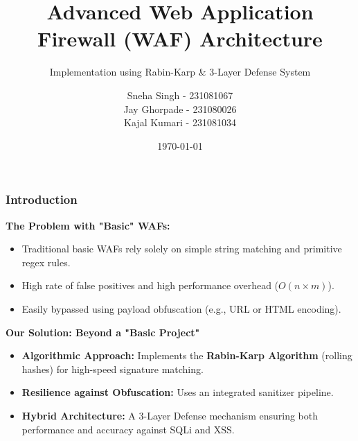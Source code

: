 \documentclass{beamer}
\title[Advanced WAF]{Advanced Web Application Firewall (WAF) Architecture}
\subtitle{Implementation using Rabin-Karp \& 3-Layer Defense System}
\author[Team]{
    Sneha Singh - 231081067 \\
    Jay Ghorpade - 231080026 \\
    Kajal Kumari - 231081034
}
\institute{Cybersecurity Lab}
\date{\today}
\begin{document}
\frame{\titlepage}

\begin{frame}
\frametitle{Introduction}
\textbf{The Problem with "Basic" WAFs:}
\begin{itemize}
    \item Traditional basic WAFs rely solely on simple string matching and primitive regex rules.
    \item High rate of false positives and high performance overhead ($O(n \times m)$).
    \item Easily bypassed using payload obfuscation (e.g., URL or HTML encoding).
\end{itemize}
\vspace{0.4cm}
\textbf{Our Solution: Beyond a "Basic Project"}
\begin{itemize}
    \item \textbf{Algorithmic Approach:} Implements the \textbf{Rabin-Karp Algorithm} (rolling hashes) for high-speed signature matching.
    \item \textbf{Resilience against Obfuscation:} Uses an integrated sanitizer pipeline.
    \item \textbf{Hybrid Architecture:} A 3-Layer Defense mechanism ensuring both performance and accuracy against SQLi and XSS.
\end{itemize}
\end{frame}
\end{document}
